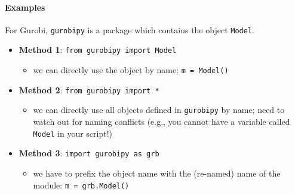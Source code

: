 \documentclass[12pt]{article}
\begin{document}
\paragraph{Examples}
For Gurobi, \texttt{gurobipy} is a package which contains the object \texttt{Model}.
\begin{itemize}
    \item \textbf{Method 1}: \texttt{from gurobipy import Model}
        \begin{itemize}
            \item we can directly use the object by name: \texttt{m = Model()}
        \end{itemize}
    \item \textbf{Method 2}: \texttt{from gurobipy import *}
        \begin{itemize}
            \item we can directly use all objects defined in \texttt{gurobipy} by name; need to watch out for naming conflicts (e.g., you cannot have a variable called \texttt{Model} in your script!)
        \end{itemize}
    \item \textbf{Method 3}: \texttt{import gurobipy as grb}
        \begin{itemize}
            \item we have to prefix the object name with the (re-named) name of the module: \texttt{m = grb.Model()}
        \end{itemize}
\end{itemize}
\end{document}
